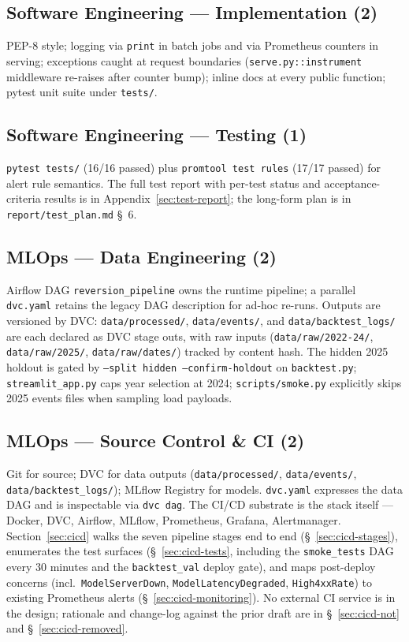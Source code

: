 \documentclass[11pt,a4paper]{article}
\begin{document}
\subsection*{Software Engineering --- Implementation (2)}
PEP-8 style; logging via \texttt{print} in batch jobs and via Prometheus counters in serving; exceptions caught at request boundaries (\texttt{serve.py::instrument} middleware re-raises after counter bump); inline docs at every public function; pytest unit suite under \texttt{tests/}.

\subsection*{Software Engineering --- Testing (1)}
\texttt{pytest tests/} (16/16 passed) plus \texttt{promtool test rules} (17/17 passed) for alert rule semantics. The full test report with per-test status and acceptance-criteria results is in Appendix~\ref{sec:test-report}; the long-form plan is in \texttt{report/test\_plan.md} \S~6.

\subsection*{MLOps --- Data Engineering (2)}
Airflow DAG \texttt{reversion\_pipeline} owns the runtime pipeline; a parallel \texttt{dvc.yaml} retains the legacy DAG description for ad-hoc re-runs. Outputs are versioned by DVC: \texttt{data/processed/}, \texttt{data/events/}, and \texttt{data/backtest\_logs/} are each declared as DVC stage outs, with raw inputs (\texttt{data/raw/2022-24/}, \texttt{data/raw/2025/}, \texttt{data/raw/dates/}) tracked by content hash. The hidden 2025 holdout is gated by \texttt{--split hidden --confirm-holdout} on \texttt{backtest.py}; \texttt{streamlit\_app.py} caps year selection at 2024; \texttt{scripts/smoke.py} explicitly skips 2025 events files when sampling load payloads.

\subsection*{MLOps --- Source Control \& CI (2)}
Git for source; DVC for data outputs (\texttt{data/processed/}, \texttt{data/events/}, \texttt{data/backtest\_logs/}); MLflow Registry for models. \texttt{dvc.yaml} expresses the data DAG and is inspectable via \texttt{dvc dag}. The CI/CD substrate is the stack itself --- Docker, DVC, Airflow, MLflow, Prometheus, Grafana, Alertmanager. Section~\ref{sec:cicd} walks the seven pipeline stages end to end (\S~\ref{sec:cicd-stages}), enumerates the test surfaces (\S~\ref{sec:cicd-tests}, including the \texttt{smoke\_tests} DAG every 30 minutes and the \texttt{backtest\_val} deploy gate), and maps post-deploy concerns (incl.\ \texttt{ModelServerDown}, \texttt{ModelLatencyDegraded}, \texttt{High4xxRate}) to existing Prometheus alerts (\S~\ref{sec:cicd-monitoring}). No external CI service is in the design; rationale and change-log against the prior draft are in \S~\ref{sec:cicd-not} and \S~\ref{sec:cicd-removed}.
\end{document}

